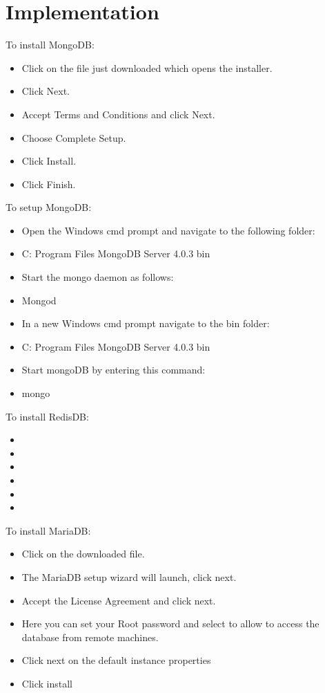 \section{Implementation}
To install MongoDB:
\begin{itemize}
\item Click on the file just downloaded which opens the installer.
\item Click Next.
\item Accept Terms and Conditions and click Next.
\item Choose Complete Setup.
\item Click Install.
\item Click Finish.
\end{itemize}
\newline
To setup MongoDB:
\begin{itemize}
\item Open the Windows cmd prompt and navigate to the following folder:
\item	C: Program Files MongoDB Server 4.0.3 bin 
\item Start the mongo daemon as follows:
\item Mongod
\item In a new Windows cmd prompt  navigate to the bin folder:
 \item C: Program Files MongoDB Server 4.0.3 bin
\item Start mongoDB by entering this command:
\item	mongo
\end{itemize}
\newline

To install RedisDB:
\begin{itemize}
\item 
\item 
\item 
\item 
\item 
\item 
\end{itemize}
 \newline
 
To install MariaDB:\newline
\begin{itemize}
\item Click on the downloaded file.
\item The MariaDB setup wizard will launch, click next.
\item Accept the License Agreement and click next.
\item Here you can set your Root password and select to allow to access the database from remote machines.
\item Click next on the default instance properties 
\item Click install 
\end{itemize}
 \newline
 
